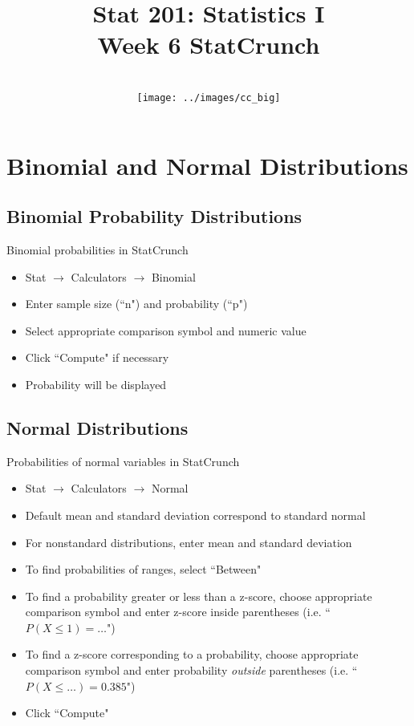\documentclass[aspectratio=169]{beamer}
\title[Week 6]{Stat 201: Statistics I\\ Week 6 StatCrunch}
\author[M. Shyne]{}
\institute[Metro State]{\texttt{[image: ../images/metro\_logo]}}
\date[10/6/2019]{
\\ \bigskip \bigskip \texttt{[image: ../images/cc\_big]}}
\begin{document}
\frame{\titlepage}

%
%
\setcounter{section}{5}
\section{Binomial and Normal Distributions}

%
%
\subsection{Binomial Probability Distributions}

\begin{frame}{Binomial probabilities in StatCrunch}
\begin{block}{}
\begin{itemize}
\item Stat $\to$ Calculators $\to$ Binomial
\item Enter sample size (``n") and probability (``p")
\item Select appropriate comparison symbol and numeric value
\item Click ``Compute" if necessary
\item Probability will be displayed
\end{itemize}
\end{block}
\end{frame}


% 
%
\subsection{Normal Distributions}


\begin{frame}{Probabilities of normal variables in StatCrunch}
\begin{block}{}
\begin{itemize}
\item Stat $\to$ Calculators $\to$ Normal
\item Default mean and standard deviation correspond to standard normal
\item For nonstandard distributions, enter mean and standard deviation
\item To find probabilities of ranges, select ``Between"
\item To find a probability greater or less than a z-score, choose appropriate comparison symbol and enter z-score inside parentheses (i.e. ``$P(X \le 1) =\ldots$")
\item To find a z-score corresponding to a probability, choose appropriate comparison symbol and enter probability \emph{outside} parentheses (i.e. ``$P(X \le \ldots) = 0.385$")
\item Click ``Compute"
\end{itemize}
\end{block}

\end{frame}
\end{document}
